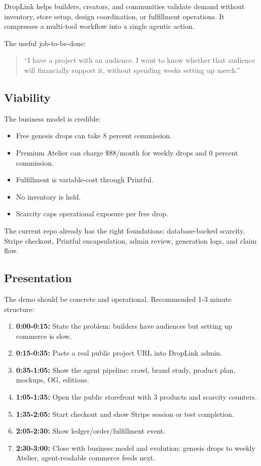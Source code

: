 \documentclass[11pt]{article}
\begin{document}
DropLink helps builders, creators, and communities validate demand without inventory, store setup, design coordination, or fulfillment operations. It compresses a multi-tool workflow into a single agentic action.

The useful job-to-be-done:

\begin{quote}
  ``I have a project with an audience. I want to know whether that audience will financially support it, without spending weeks setting up merch.''
\end{quote}

\subsection{Viability}

The business model is credible:

\begin{itemize}
  \item Free genesis drops can take 8 percent commission.
  \item Premium Atelier can charge \(\$88\)/month for weekly drops and 0 percent commission.
  \item Fulfillment is variable-cost through Printful.
  \item No inventory is held.
  \item Scarcity caps operational exposure per free drop.
\end{itemize}

The current repo already has the right foundations: database-backed scarcity, Stripe checkout, Printful encapsulation, admin review, generation logs, and claim flow.

\subsection{Presentation}

The demo should be concrete and operational. Recommended 1-3 minute structure:

\begin{enumerate}
  \item \textbf{0:00-0:15:} State the problem: builders have audiences but setting up commerce is slow.
  \item \textbf{0:15-0:35:} Paste a real public project URL into DropLink admin.
  \item \textbf{0:35-1:05:} Show the agent pipeline: crawl, brand study, product plan, mockups, OG, editions.
  \item \textbf{1:05-1:35:} Open the public storefront with 3 products and scarcity counters.
  \item \textbf{1:35-2:05:} Start checkout and show Stripe session or test completion.
  \item \textbf{2:05-2:30:} Show ledger/order/fulfillment event.
  \item \textbf{2:30-3:00:} Close with business model and evolution: genesis drops to weekly Atelier, agent-readable commerce feeds next.
\end{enumerate}
\end{document}
